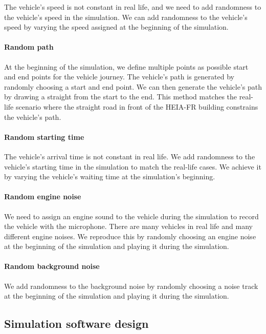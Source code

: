 The vehicle's speed is not constant in real life, and we need to add randomness to the vehicle's speed in the simulation. We can add randomness to the vehicle's speed by varying the speed assigned at the beginning of the simulation. 

\paragraph{Random path}

At the beginning of the simulation, we define multiple points as possible start and end points for the vehicle journey. The vehicle's path is generated by randomly choosing a start and end point. We can then generate the vehicle's path by drawing a straight from the start to the end. This method matches the real-life scenario where the straight road in front of the HEIA-FR building constrains the vehicle's path. 

\paragraph{Random starting time}

The vehicle's arrival time is not constant in real life. We add randomness to the vehicle's starting time in the simulation to match the real-life cases. We achieve it by varying the vehicle's waiting time at the simulation's beginning.

\paragraph{Random engine noise}

We need to assign an engine sound to the vehicle during the simulation to record the vehicle with the microphone. There are many vehicles in real life and many different engine noises. We reproduce this by randomly choosing an engine noise at the beginning of the simulation and playing it during the simulation. 

\paragraph{Random background noise}

We add randomness to the background noise by randomly choosing a noise track at the beginning of the simulation and playing it during the simulation.

\subsection{Simulation software design}

